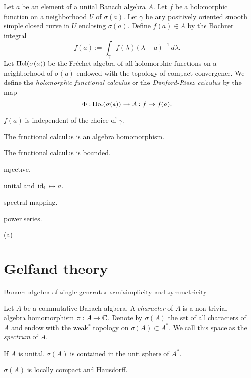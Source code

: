 \documentclass{../../large}
\begin{document}
\begin{prb}
Let $a$ be an element of a unital Banach algebra $A$.
Let $f$ be a holomorphic function on a neighborhood $U$ of $\sigma(a)$.
Let $\gamma$ be any positively oriented smooth simple closed curve in $U$ enclosing $\sigma(a)$.
Define $f(a)\in A$ by the Bochner integral
\[f(a):=\int_\gamma f(\lambda)(\lambda-a)^{-1}\,d\lambda.\]
Let $\operatorname{Hol}(\sigma(a))$ be the Fr\'echet algebra of all holomorphic functions on a neighborhood of $\sigma(a)$ endowed with the topology of compact convergence.
We define the \emph{holomorphic functional calculus} or the \emph{Dunford-Riesz calculus} by the map
\[\Phi:\operatorname{Hol}(\sigma(a))\to A:f\mapsto f(a).\]
\begin{parts}
\item $f(a)$ is independent of the choice of $\gamma$.
\item The functional calculus is an algebra homomorphism.
\item The functional calculus is bounded.
\item injective.
\item unital and $\operatorname{id}_{\mathbb{C}}\mapsto a$.
\item spectral mapping.
\item power series.
\end{parts}
\end{prb}
\begin{pf}
(a)


\end{pf}





\section{Gelfand theory}

Banach algebra of single generator
semisimplicity and symmetricity

\begin{prb}
Let $A$ be a commutative Banach algbera.
A \emph{character} of $A$ is a non-trivial algebra homomorphism $\pi:A\to\mathbb{C}$.
Denote by $\sigma(A)$ the set of all characters of $A$ and endow with the weak$^*$ topology on $\sigma(A)\subset A^*$.
We call this space as the \emph{spectrum} of $A$.
\begin{parts}
\item If $A$ is unital, $\sigma(A)$ is contained in the unit sphere of $A^*$.
\item $\sigma(A)$ is locally compact and Hausdorff.
\end{parts}
\end{prb}
\begin{pf}

\end{pf}
\end{document}
